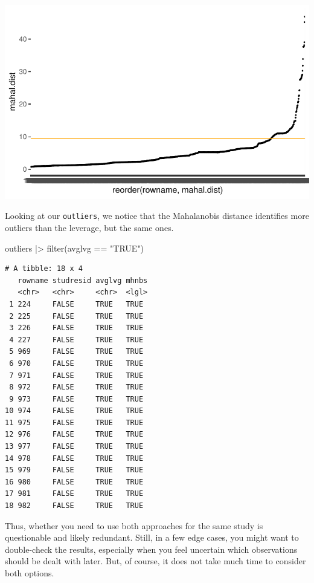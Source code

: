 \documentclass[
  letterpaper,
  DIV=11,
  numbers=noendperiod]{scrreprt}
\newenvironment{Shaded}{\begin{snugshade}}{\end{snugshade}}
\newcommand{\FunctionTok}[1]{\textcolor[rgb]{0.28,0.35,0.67}{#1}}
\newcommand{\NormalTok}[1]{\textcolor[rgb]{0.00,0.23,0.31}{#1}}
\newcommand{\SpecialCharTok}[1]{\textcolor[rgb]{0.37,0.37,0.37}{#1}}
\newcommand{\StringTok}[1]{\textcolor[rgb]{0.13,0.47,0.30}{#1}}
\begin{document}
\includegraphics{13_regressions_files/figure-latex/mahalanobis-distance-plot-1.pdf}

Looking at our \texttt{outliers}, we notice that the Mahalanobis
distance identifies more outliers than the leverage, but the same ones.

\begin{Shaded}
\begin{Highlighting}[]
\NormalTok{outliers }\SpecialCharTok{|\textgreater{}} \FunctionTok{filter}\NormalTok{(avglvg }\SpecialCharTok{==} \StringTok{"TRUE"}\NormalTok{)}
\end{Highlighting}
\end{Shaded}

\begin{verbatim}
# A tibble: 18 x 4
   rowname studresid avglvg mhnbs
   <chr>   <chr>     <chr>  <lgl>
 1 224     FALSE     TRUE   TRUE 
 2 225     FALSE     TRUE   TRUE 
 3 226     FALSE     TRUE   TRUE 
 4 227     FALSE     TRUE   TRUE 
 5 969     FALSE     TRUE   TRUE 
 6 970     FALSE     TRUE   TRUE 
 7 971     FALSE     TRUE   TRUE 
 8 972     FALSE     TRUE   TRUE 
 9 973     FALSE     TRUE   TRUE 
10 974     FALSE     TRUE   TRUE 
11 975     FALSE     TRUE   TRUE 
12 976     FALSE     TRUE   TRUE 
13 977     FALSE     TRUE   TRUE 
14 978     FALSE     TRUE   TRUE 
15 979     FALSE     TRUE   TRUE 
16 980     FALSE     TRUE   TRUE 
17 981     FALSE     TRUE   TRUE 
18 982     FALSE     TRUE   TRUE 
\end{verbatim}

Thus, whether you need to use both approaches for the same study is
questionable and likely redundant. Still, in a few edge cases, you might
want to double-check the results, especially when you feel uncertain
which observations should be dealt with later. But, of course, it does
not take much time to consider both options.
\end{document}
